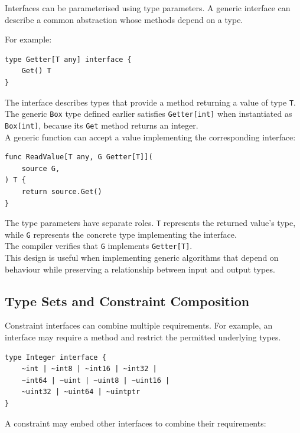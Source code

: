 Interfaces can be parameterised using type parameters. A generic interface can describe a common abstraction whose methods depend on a type.

For example:

\begin{lstlisting}
type Getter[T any] interface {
    Get() T
}
\end{lstlisting}

The interface describes types that provide a method returning a value of type \texttt{T}.\\

The generic \texttt{Box} type defined earlier satisfies \texttt{Getter[int]} when instantiated as \texttt{Box[int]}, because its \texttt{Get} method returns an integer.\\

A generic function can accept a value implementing the corresponding interface:

\begin{lstlisting}
func ReadValue[T any, G Getter[T]](
    source G,
) T {
    return source.Get()
}
\end{lstlisting}

The type parameters have separate roles. \texttt{T} represents the returned value's type, while \texttt{G} represents the concrete type implementing the interface.\\

The compiler verifies that \texttt{G} implements \texttt{Getter[T]}.\\

This design is useful when implementing generic algorithms that depend on behaviour while preserving a relationship between input and output types.\\

\subsection{Type Sets and Constraint Composition}

Constraint interfaces can combine multiple requirements. For example, an interface may require a method and restrict the permitted underlying types.

\begin{lstlisting}
type Integer interface {
    ~int | ~int8 | ~int16 | ~int32 |
    ~int64 | ~uint | ~uint8 | ~uint16 |
    ~uint32 | ~uint64 | ~uintptr
}
\end{lstlisting}

A constraint may embed other interfaces to combine their requirements:

